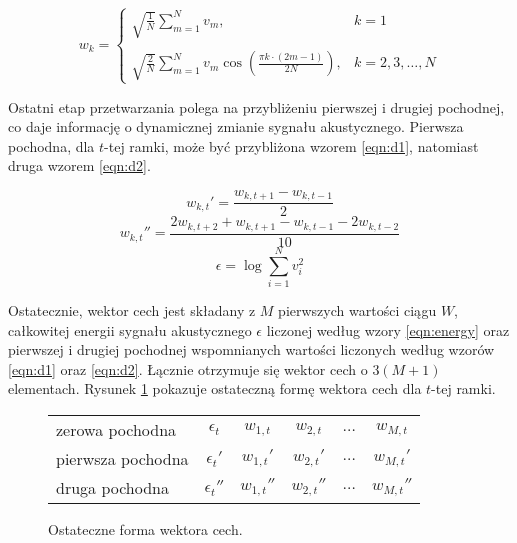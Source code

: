 \documentclass[shortabstract, mgr]{iithesis}
\begin{document}
	 \begin{equation}
		w_k = 
		\begin{cases}
			\sqrt{\frac{1}{N}}\sum_{m=1}^{N}v_m, & k = 1 \\
			&\\
			\sqrt{\frac{2}{N}}\sum_{m=1}^{N}{v_m \cos(\frac{\pi k \cdot (2m - 1)}{2N})}, & k = 2,3,\ldots,N
		\end{cases}
		\label{eqn:DCT}
	 \end{equation}
	 
	 Ostatni etap przetwarzania polega na przybliżeniu pierwszej i drugiej pochodnej, co daje informację o dynamicznej zmianie sygnału akustycznego. Pierwsza pochodna, dla $t$-tej ramki, może być przybliżona wzorem \ref{eqn:d1}, natomiast druga wzorem \ref{eqn:d2}.
	 
	 \begin{equation}
	 	 w_{k,t}'=\frac{w_{k,t+1}-w_{k,t-1}}{2}
	 	 \label{eqn:d1}
	 \end{equation}
	 \begin{equation}
		 w_{k,t}''=\frac{2w_{k,t+2}+w_{k,t+1}-w_{k,t-1}-2w_{k,t-2}}{10}
		 \label{eqn:d2}
	 \end{equation}
	 \begin{equation}
	 	\epsilon = \log \sum_{i=1}^N {v_i^2}
	 	\label{eqn:energy}
	 \end{equation}
	 
	 Ostatecznie, wektor cech jest składany z $M$ pierwszych wartości ciągu $W$, całkowitej energii sygnału akustycznego $\epsilon$ liczonej według wzory \ref{eqn:energy} oraz pierwszej i drugiej pochodnej wspomnianych wartości liczonych według wzorów \ref{eqn:d1} oraz \ref{eqn:d2}. Łącznie otrzymuje się wektor cech o $3(M+1)$ elementach. Rysunek \ref{fig:feature_vector} pokazuje ostateczną formę wektora cech dla $t$-tej ramki.
	 
	\begin{figure}[H]
		\begin{center}
			\begin{tabular}{l|ccccc}
				zerowa pochodna   & $\epsilon_t$   & $w_{1,t}$   & $w_{2,t}$   & $\ldots$ & $w_{M,t}$   \\
				pierwsza pochodna & $\epsilon_t'$  & $w_{1,t}'$  & $w_{2,t}'$  & $\ldots$ & $w_{M,t}'$  \\
				druga pochodna    & $\epsilon_t''$ & $w_{1,t}''$ & $w_{2,t}''$ & $\ldots$ & $w_{M,t}''$ \\
			\end{tabular}
			\label{fig:feature_vector}
			\caption{Ostateczne forma wektora cech.}
		\end{center}
	\end{figure}
\end{document}

